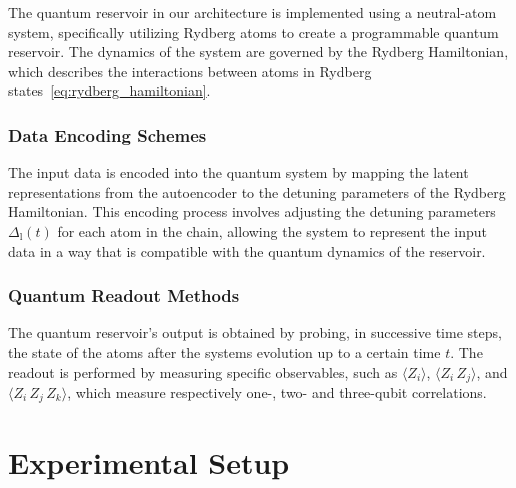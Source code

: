 \documentclass[conference]{IEEEtran}
\begin{document}
The quantum reservoir in our architecture is implemented
using a neutral-atom system, specifically utilizing
Rydberg atoms to create a programmable quantum reservoir.
The dynamics of the system are governed by the Rydberg Hamiltonian,
which describes the interactions between atoms in Rydberg states~\ref{eq:rydberg_hamiltonian}.


\subsubsection{Data Encoding Schemes}
The input data is encoded into the quantum system by mapping
the latent representations from the autoencoder to the
detuning parameters of the Rydberg Hamiltonian.
This encoding process involves adjusting the detuning
parameters \( \Delta_{\mathrm{l}}(t) \) for each atom in the chain,
allowing the system to represent the input data in a way that
is compatible with the quantum dynamics of the reservoir.

\subsubsection{Quantum Readout Methods}
The quantum reservoir's output is obtained by probing, 
in successive time steps, the state of the atoms 
after the systems evolution up to a certain time \( t \).
The readout is performed by measuring specific observables,
such as $\langle Z_i \rangle$, $\langle Z_i \, Z_j\rangle$, and $\langle Z_i \, Z_j \, Z_k \rangle$, which measure respectively one-, two- and three-qubit correlations.


\section{Experimental Setup}
\end{document}
